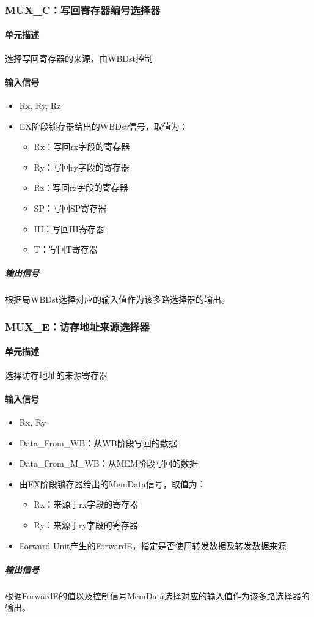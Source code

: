 \documentclass{article}
\begin{document}
\subsubsection{MUX\_C：写回寄存器编号选择器}	
\paragraph{单元描述}
选择写回寄存器的来源，由WBDst控制
\paragraph{输入信号}
\begin{itemize}
\item Rx, Ry, Rz
\item EX阶段锁存器给出的WBDst信号，取值为：
\begin{itemize}
\item Rx：写回rx字段的寄存器
\item Ry：写回ry字段的寄存器
\item Rz：写回rz字段的寄存器
\item SP：写回SP寄存器
\item IH：写回IH寄存器
\item T：写回T寄存器
\end{itemize}
\end{itemize}

\subparagraph{输出信号}
根据局WBDst选择对应的输入值作为该多路选择器的输出。

\subsubsection{MUX\_E：访存地址来源选择器}
\paragraph{单元描述}
选择访存地址的来源寄存器
\paragraph{输入信号}
\begin{itemize}
\item Rx, Ry
\item Data\_From\_WB：从WB阶段写回的数据
\item Data\_From\_M\_WB：从MEM阶段写回的数据
\item 由EX阶段锁存器给出的MemData信号，取值为：
\begin{itemize}
	\item Rx：来源于rx字段的寄存器
	\item Ry：来源于ry字段的寄存器
\end{itemize}
\item Forward Unit产生的ForwardE，指定是否使用转发数据及转发数据来源
\end{itemize}
\subparagraph{输出信号}
根据ForwardE的值以及控制信号MemData选择对应的输入值作为该多路选择器的输出。
	
\end{document}
